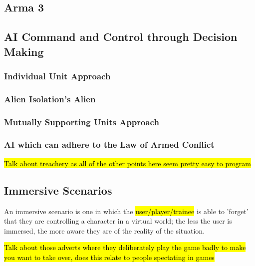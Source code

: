 \documentclass{article}
\begin{document}
\subsection{Arma 3}

\subsection{AI Command and Control through Decision Making}

\subsubsection{Individual Unit Approach}

\subsubsection{Alien Isolation's Alien}



\subsubsection{Mutually Supporting Units Approach}

\subsubsection{AI which can adhere to the Law of Armed Conflict}

\hl{Talk about treachery as all of the other points here seem pretty easy to program}


\subsection{Immersive Scenarios}

An immersive scenario is one in which the \hl{user/player/trainee} is able to 'forget' that they are controlling a character in a virtual world; the less the user is immersed, the more aware they are of the reality of the situation.

\hl{Talk about those adverts where they deliberately play the game badly to make you want to take over, does this relate to people spectating in games}

\end{document}

